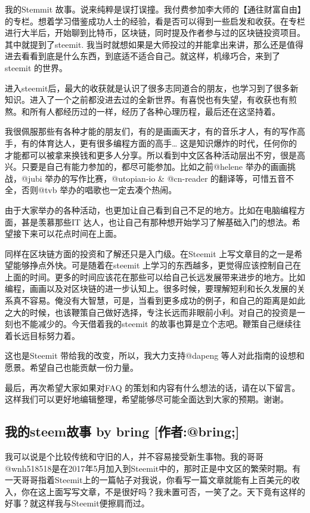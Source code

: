 \documentclass[]{ctexbook}
\begin{document}
我的Stemmit 故事。说来纯粹是误打误撞。我付费参加李大师的【通往财富自由】的专栏。想着学习借鉴成功人士的经验，看是否可以得到一些启发和收获。在专栏进行大半后，开始聊到比特币，区块链，同时提及作者参与过的区块链投资项目。其中就提到了steemit. 我当时就想如果是大师投过的并能拿出来讲，那么还是值得进去看看到底是什么东西，到底适不适合自己。就这样，机缘巧合，来到了steemit 的世界。

进入steemit后，最大的收获就是认识了很多志同道合的朋友，也学习到了很多新知识。进入了一个之前都没进去过的全新世界。有喜悦也有失望，有收获也有煎熬。和所有人都经历过的一样，经历了各种心理历程，最后还在这坚持着。

我很佩服那些有各种才能的朋友们，有的是画画天才，有的音乐才人，有的写作高手，有的体育达人，更有很多编程方面的高手\ldots{} 这是知识爆炸的时代，任何你的才能都可以被拿来换钱和更多人分享。所以看到中文区各种活动层出不穷，很是高兴。只要是自己有能力参加的，都尽可能参加。比如之前@helene 举办的画画挑战，@jubi 举办的写作比赛，@utopian-io \& @cn-reader 的翻译等，可惜五音不全，否则@tvb 举办的唱歌也一定去凑个热闹。

由于大家举办的各种活动，也更加让自己看到自己不足的地方。比如在电脑编程方面，甚是羡慕那些IT 达人，也让自己有那种想开始学习了解基础入门的想法。希望接下来可以花点时间在上面。

同样在区块链方面的投资和了解还只是入门级。在Steemit 上写文章目的之一是希望能够挣点外快。可是随着在steemit 上学习的东西越多，更觉得应该控制自己在上面的时间。更多的时间应该花在那些可以给自己长远发展带来进步的地方。比如编程，画画以及对区块链的进一步认知上。很多时候，要理解短利和长久发展的关系真不容易。俺没有大智慧，可是，当看到更多成功的例子，和自己的距离是如此之大的时候，也该鞭策自己做好选择，专注长远而非眼前小利。对自己的投资是一刻也不能减少的。今天借着我的steemit 的故事也算是立个志吧。鞭策自己继续往着长远目标努力着。

这也是Steemit 带给我的改变，所以，我大力支持@dapeng 等人对此指南的设想和愿景。希望自己也能贡献一份力量。

最后，再次希望大家如果对FAQ 的策划和内容有什么想法的话，请在以下留言。这样我们可以更好地编辑整理，希望能够尽可能全面达到大家的预期。谢谢。

\hypertarget{steem-by-bring-bring}{%
\subsection{我的steem故事 by bring {[}作者:@bring;{]}}\label{steem-by-bring-bring}}

我可以说是个比较传统和守旧的人，并不容易接受新生事物。我的哥哥 @wnh518518是在2017年5月加入到Steemit中的，那时正是中文区的繁荣时期。有一天哥哥指着Steemit上的一篇帖子对我说，你看写一篇文章就能有上百美元的收入，你在这上面写写文章，不是很好吗？我未置可否，一笑了之。天下竟有这样的好事？就这样我与Steemit便擦肩而过。
\end{document}
